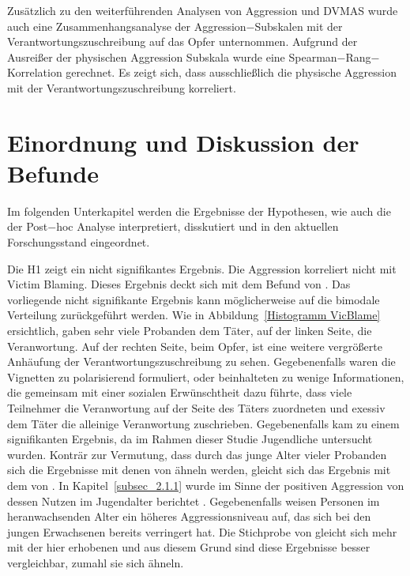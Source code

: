 Zusätzlich zu den weiterführenden Analysen von Aggression und DVMAS wurde auch eine Zusammenhangsanalyse der Aggression$-$Subskalen mit der Verantwortungszuschreibung auf das Opfer unternommen. Aufgrund der Ausreißer der physischen Aggression Subskala wurde eine Spearman$-$Rang$-$Korrelation gerechnet. Es zeigt sich, dass ausschließlich die physische Aggression mit der Verantwortungszuschreibung korreliert.


\section{Einordnung und Diskussion der Befunde}     \label{sec_5.2}
Im folgenden Unterkapitel werden die Ergebnisse der Hypothesen, wie auch die der Post$-$hoc Analyse interpretiert, disskutiert und in den aktuellen Forschungsstand eingeordnet.

Die H1 zeigt ein nicht signifikantes Ergebnis. Die Aggression korreliert nicht mit Victim Blaming. Dieses Ergebnis deckt sich mit dem Befund von \textcite{H1_moderation_2020}. Das vorliegende nicht signifikante Ergebnis kann möglicherweise auf die bimodale Verteilung zurückgeführt werden. Wie in Abbildung~\ref{Histogramm VicBlame} ersichtlich, gaben sehr viele Probanden dem Täter, auf der linken Seite, die Veranwortung. Auf der rechten Seite, beim Opfer, ist eine weitere vergrößerte Anhäufung der Verantwortungszuschreibung zu sehen. Gegebenenfalls waren die Vignetten zu polarisierend formuliert, oder beinhalteten zu wenige Informationen, die gemeinsam mit einer sozialen Erwünschtheit dazu führte, dass viele Teilnehmer die Veranwortung auf der Seite des Täters zuordneten und exessiv dem Täter die alleinige Veranwortung zuschrieben. Gegebenenfalls kam \textcite{H1_malasia_2012} zu einem signifikanten Ergebnis, da im Rahmen dieser Studie Jugendliche untersucht wurden. Konträr zur Vermutung, dass durch das junge Alter vieler Probanden sich die Ergebnisse mit denen von \textcite{H1_malasia_2012} ähneln werden, gleicht sich das Ergebnis mit dem von \textcite{H1_moderation_2020}. In Kapitel~\ref{subsec_2.1.1} wurde im Sinne der positiven Aggression von dessen Nutzen im Jugendalter berichtet \parencite{Aggression}. Gegebenenfalls weisen Personen im heranwachsenden Alter ein höheres Aggressionsniveau auf, das sich bei den jungen Erwachsenen bereits verringert hat. Die Stichprobe von \textcite{H1_moderation_2020} gleicht sich mehr mit der hier erhobenen und aus diesem Grund sind diese Ergebnisse besser vergleichbar, zumahl sie sich ähneln.

